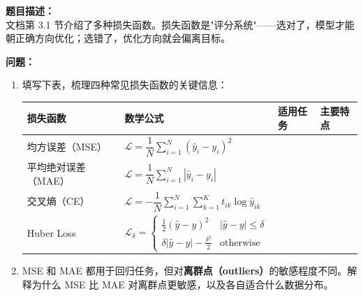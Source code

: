 \documentclass[a4paper,11pt]{ctexart}
\begin{document}
\begin{problembox}
    \textbf{题目描述：}\\
    文档第 3.1 节介绍了多种损失函数。损失函数是"评分系统"——选对了，模型才能朝正确方向优化；选错了，优化方向就会偏离目标。

    \vspace{0.3cm}
    \textbf{问题：}
    \begin{enumerate}[(1)]
        \item 填写下表，梳理四种常见损失函数的关键信息：

        \begin{center}
        \begin{tabular}{p{2.2cm} p{4.5cm} p{2.5cm} p{2.5cm}}
            \toprule
            损失函数 & 数学公式 & 适用任务 & 主要特点 \\
            \midrule
            均方误差（MSE） & $\mathcal{L} = \dfrac{1}{N}\displaystyle\sum_{i=1}^N (\hat{y}_i - y_i)^2$ & \underline{\hspace{2cm}} & \underline{\hspace{2cm}} \\[2.0em]
            平均绝对误差（MAE） & $\mathcal{L} = \dfrac{1}{N}\displaystyle\sum_{i=1}^N |\hat{y}_i - y_i|$ & \underline{\hspace{2cm}} & \underline{\hspace{2cm}} \\[2.0em]
            交叉熵（CE） & $\mathcal{L} = -\dfrac{1}{N}\displaystyle\sum_{i=1}^N\sum_{k=1}^K t_{ik}\log \hat{y}_{ik}$ & \underline{\hspace{2cm}} & \underline{\hspace{2cm}} \\[2.0em]
            Huber Loss & $\mathcal{L}_\delta = \begin{cases}\frac{1}{2}(\hat{y}-y)^2 & |\hat{y}-y|\leq\delta \\ \delta|\hat{y}-y|-\frac{\delta^2}{2} & \text{otherwise}\end{cases}$ & \underline{\hspace{2cm}} & \underline{\hspace{2cm}} \\
            \bottomrule
        \end{tabular}
        \end{center}

        \item MSE 和 MAE 都用于回归任务，但对\textbf{离群点（outliers）}的敏感程度不同。解释为什么 MSE 比 MAE 对离群点更敏感，以及各自适合什么数据分布。


\end{enumerate}
\end{problembox}
\end{document}
